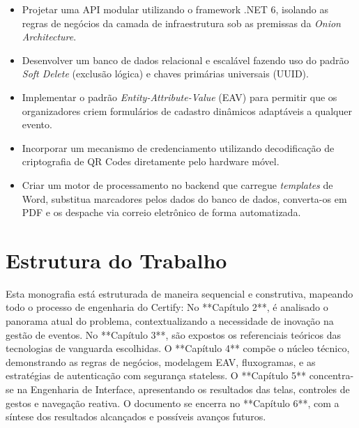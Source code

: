 \begin{itemize}
    \item Projetar uma API modular utilizando o framework .NET 6, isolando as regras de negócios da camada de infraestrutura sob as premissas da \textit{Onion Architecture}.
    \item Desenvolver um banco de dados relacional e escalável fazendo uso do padrão \textit{Soft Delete} (exclusão lógica) e chaves primárias universais (UUID).
    \item Implementar o padrão \textit{Entity-Attribute-Value} (EAV) para permitir que os organizadores criem formulários de cadastro dinâmicos adaptáveis a qualquer evento.
    \item Incorporar um mecanismo de credenciamento utilizando decodificação de criptografia de QR Codes diretamente pelo hardware móvel.
    \item Criar um motor de processamento no backend que carregue \textit{templates} de Word, substitua marcadores pelos dados do banco de dados, converta-os em PDF e os despache via correio eletrônico de forma automatizada.
\end{itemize}

\section{Estrutura do Trabalho}

Esta monografia está estruturada de maneira sequencial e construtiva, mapeando todo o processo de engenharia do Certify:
No **Capítulo 2**, é analisado o panorama atual do problema, contextualizando a necessidade de inovação na gestão de eventos. 
No **Capítulo 3**, são expostos os referenciais teóricos das tecnologias de vanguarda escolhidas. 
O **Capítulo 4** compõe o núcleo técnico, demonstrando as regras de negócios, modelagem EAV, fluxogramas, e as estratégias de autenticação com segurança stateless.
O **Capítulo 5** concentra-se na Engenharia de Interface, apresentando os resultados das telas, controles de gestos e navegação reativa. 
O documento se encerra no **Capítulo 6**, com a síntese dos resultados alcançados e possíveis avanços futuros.
